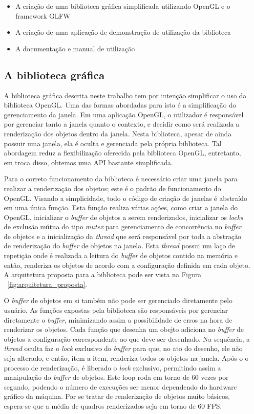 \documentclass[12pt, %
openright,
oneside, %
a4paper,    %
brazil]{facom-ufu-abntex2}
\begin{document}
\begin{itemize}
    \item A criação de uma biblioteca gráfica simplificada utilizando OpenGL e o framework GLFW
    \item A criação de uma aplicação de demonstração de utilização da biblioteca
    \item A documentação e manual de utilização
\end{itemize}

\subsection{A biblioteca gráfica}
A biblioteca gráfica descrita neste trabalho tem por intenção simplificar o uso da biblioteca OpenGL. Uma das formas abordadas para isto é a simplificação do gerenciamento da janela. Em uma aplicação OpenGL, o utilizador é responsável por gerenciar tanto a janela quanto o contexto, e decidir como será realizada a renderização dos objetos dentro da janela. Nesta biblioteca, apesar de ainda possuir uma janela, ela é oculta e gerenciada pela própria biblioteca. Tal abordagem reduz a flexibilização oferecida pela biblioteca OpenGL, entretanto, em troca disso, obtemos uma API bastante simplificada.

Para o correto funcionamento da biblioteca é necessário criar uma janela para realizar a renderização dos objetos; este é o padrão de funcionamento do OpenGL. Visando a simplicidade, todo o código de criação de janelas é abstraído em uma única função. Esta função realiza várias ações, como criar a janela do OpenGL, inicializar o \textit{buffer} de objetos a serem renderizados, inicializar os \textit{locks} de exclusão mútua do tipo \textit{mutex} para gerenciamento de concorrência no \textit{buffer} de objetos e a inicialização da \textit{thread} que será responsável por toda a abstração de renderização do \textit{buffer} de objetos na janela. Esta \textit{thread} possui um laço de repetição onde é realizada a leitura do \textit{buffer} de objetos contido na memória e então, renderiza os objetos de acordo com a configuração definida em cada objeto. A arquitetura proposta para a biblioteca pode ser vista na Figura ~\ref{fig:arquitetura_proposta}.

O \textit{buffer} de objetos em si também não pode ser gerenciado diretamente pelo usuário. As funções expostas pela biblioteca são responsáveis por gerenciar diretamente o \textit{buffer}, minimizando assim a possibilidade de erros na hora de renderizar os objetos. Cada função que desenha um obejto adiciona no \textit{buffer} de objetos a configuração correspondente ao que deve ser desenhado. Na sequência, a \textit{thread} oculta faz o \textit{lock} exclusivo do \textit{buffer} para que, no ato do desenho, ele não seja alterado, e então, item a item, renderiza todos os objetos na janela. Após o o processo de renderização, é liberado o \textit{lock} exclusivo, permitindo assim a manipulação do \textit{buffer} de objetos. Este loop roda em torno de 60 vezes por segundo, podendo o número de execuções ser menor dependendo do hardware gráfico da máquina. Por se tratar de renderização de objetos muito básicos, espera-se que a média de quadros renderizados seja em torno de 60 FPS.
\end{document}
